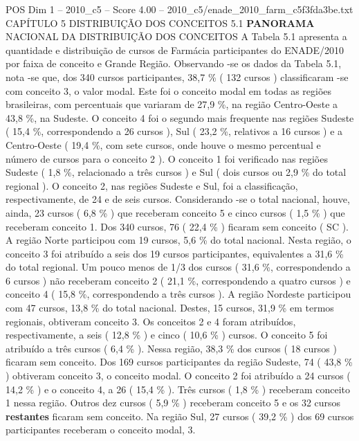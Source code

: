 \begin{textsample}{POS Dim 1 – 2010\_c5 – Score 4.00 – 2010\_c5/enade\_2010\_farm\_c5f3fda3be.txt}  \label{ex:f1_pos_136}
CAPÍTULO 5 DISTRIBUIÇÃO DOS CONCEITOS 5.1 \textbf{PANORAMA} NACIONAL DA DISTRIBUIÇÃO DOS CONCEITOS A Tabela 5.1 apresenta a quantidade e distribuição de cursos de Farmácia participantes do ENADE/2010 por faixa de conceito e Grande Região.
Observando -se os dados da Tabela 5.1, nota -se que, dos 340 cursos participantes, 38,7 \% ( 132 cursos ) classificaram -se com conceito 3, o valor modal.
Este foi o conceito modal em todas as regiões brasileiras, com percentuais que variaram de 27,9 \%, na região Centro-Oeste a 43,8 \%, na Sudeste.
O conceito 4 foi o segundo mais frequente nas regiões Sudeste ( 15,4 \%, correspondendo a 26 cursos ), Sul ( 23,2 \%, relativos a 16 cursos ) e a Centro-Oeste ( 19,4 \%, com sete cursos, onde houve o mesmo percentual e número de cursos para o conceito 2 ).
O conceito 1 foi verificado nas regiões Sudeste ( 1,8 \%, relacionado a três cursos ) e Sul ( dois cursos ou 2,9 \% do total regional ).
O conceito 2, nas regiões Sudeste e Sul, foi a classificação, respectivamente, de 24 e de seis cursos.
Considerando -se o total nacional, houve, ainda, 23 cursos ( 6,8 \% ) que receberam conceito 5 e cinco cursos ( 1,5 \% ) que receberam conceito 1.
Dos 340 cursos, 76 ( 22,4 \% ) ficaram sem conceito ( SC ).
A região Norte participou com 19 cursos, 5,6 \% do total nacional.
Nesta região, o conceito 3 foi atribuído a seis dos 19 cursos participantes, equivalentes a 31,6 \% do total regional.
Um pouco menos de 1/3 dos cursos ( 31,6 \%, correspondendo a 6 cursos ) não receberam conceito 2 ( 21,1 \%, correspondendo a quatro cursos ) e conceito 4 ( 15,8 \%, correspondendo a três cursos ).
A região Nordeste participou com 47 cursos, 13,8 \% do total nacional.
Destes, 15 cursos, 31,9 \% em termos regionais, obtiveram conceito 3.
Os conceitos 2 e 4 foram atribuídos, respectivamente, a seis ( 12,8 \% ) e cinco ( 10,6 \% ) cursos.
O conceito 5 foi atribuído a três cursos ( 6,4 \% ).
Nessa região, 38,3 \% dos cursos ( 18 cursos ) ficaram sem conceito.
Dos 169 cursos participantes da região Sudeste, 74 ( 43,8 \% ) obtiveram conceito 3, o conceito modal.
O conceito 2 foi atribuído a 24 cursos ( 14,2 \% ) e o conceito 4, a 26 ( 15,4 \% ).
Três cursos ( 1,8 \% ) receberam conceito 1 nessa região.
Outros dez cursos ( 5,9 \% ) receberam conceito 5 e os 32 cursos \textbf{restantes} ficaram sem conceito.
Na região Sul, 27 cursos ( 39,2 \% ) dos 69 cursos participantes receberam o conceito modal, 3.

\end{textsample}

